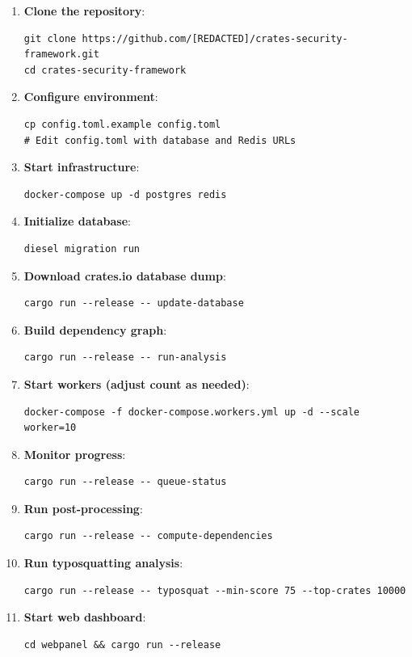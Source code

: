 \begin{enumerate}
    \item \textbf{Clone the repository}:
\begin{verbatim}
git clone https://github.com/[REDACTED]/crates-security-framework.git
cd crates-security-framework
\end{verbatim}

    \item \textbf{Configure environment}:
\begin{verbatim}
cp config.toml.example config.toml
# Edit config.toml with database and Redis URLs
\end{verbatim}

    \item \textbf{Start infrastructure}:
\begin{verbatim}
docker-compose up -d postgres redis
\end{verbatim}

    \item \textbf{Initialize database}:
\begin{verbatim}
diesel migration run
\end{verbatim}

    \item \textbf{Download crates.io database dump}:
\begin{verbatim}
cargo run --release -- update-database
\end{verbatim}

    \item \textbf{Build dependency graph}:
\begin{verbatim}
cargo run --release -- run-analysis
\end{verbatim}

    \item \textbf{Start workers (adjust count as needed)}:
\begin{verbatim}
docker-compose -f docker-compose.workers.yml up -d --scale worker=10
\end{verbatim}

    \item \textbf{Monitor progress}:
\begin{verbatim}
cargo run --release -- queue-status
\end{verbatim}

    \item \textbf{Run post-processing}:
\begin{verbatim}
cargo run --release -- compute-dependencies
\end{verbatim}

    \item \textbf{Run typosquatting analysis}:
\begin{verbatim}
cargo run --release -- typosquat --min-score 75 --top-crates 10000
\end{verbatim}

    \item \textbf{Start web dashboard}:
\begin{verbatim}
cd webpanel && cargo run --release
\end{verbatim}
\end{enumerate}

